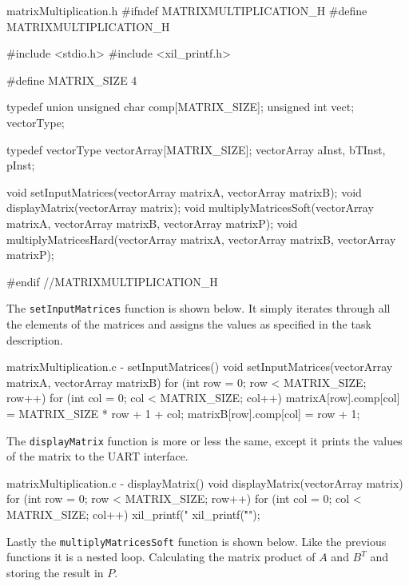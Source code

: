 \documentclass[../main.tex]{subfiles}
\begin{document}
\begin{myminted}{matrixMultiplication.h}
#ifndef MATRIXMULTIPLICATION_H
#define MATRIXMULTIPLICATION_H

#include <stdio.h>
#include <xil_printf.h>

#define MATRIX_SIZE 4

typedef union {
    unsigned char comp[MATRIX_SIZE];
    unsigned int vect;
} vectorType;

typedef vectorType vectorArray[MATRIX_SIZE];
vectorArray aInst, bTInst, pInst;

void setInputMatrices(vectorArray matrixA, vectorArray matrixB);
void displayMatrix(vectorArray matrix);
void multiplyMatricesSoft(vectorArray matrixA, vectorArray matrixB, vectorArray matrixP);
void multiplyMatricesHard(vectorArray matrixA, vectorArray matrixB, vectorArray matrixP);

#endif //MATRIXMULTIPLICATION_H
\end{myminted}

\newpage

The \texttt{setInputMatrices} function is shown below. It simply iterates through all the elements of the matrices and assigns the values as specified in the task description.

\begin{myminted}{matrixMultiplication.c - setInputMatrices()}
void setInputMatrices(vectorArray matrixA, vectorArray matrixB)
{
    for (int row = 0; row < MATRIX_SIZE; row++) {
        for (int col = 0; col < MATRIX_SIZE; col++) {
            matrixA[row].comp[col] = MATRIX_SIZE * row + 1 + col;
            matrixB[row].comp[col] = row + 1;
        }
    }
}
\end{myminted}

The \texttt{displayMatrix} function is more or less the same, except it prints the values of the matrix to the UART interface.

\begin{myminted}{matrixMultiplication.c - displayMatrix()}
void displayMatrix(vectorArray matrix)
{
    for (int row = 0; row < MATRIX_SIZE; row++)  {
        for (int col = 0; col < MATRIX_SIZE; col++) {
            xil_printf("%
        }
        xil_printf("\r\n");
    }
}
\end{myminted}

Lastly the \texttt{multiplyMatricesSoft} function is shown below. Like the previous functions it is a nested loop. Calculating the matrix product of $A$ and $B^T$ and storing the result in $P$.
\end{document}
